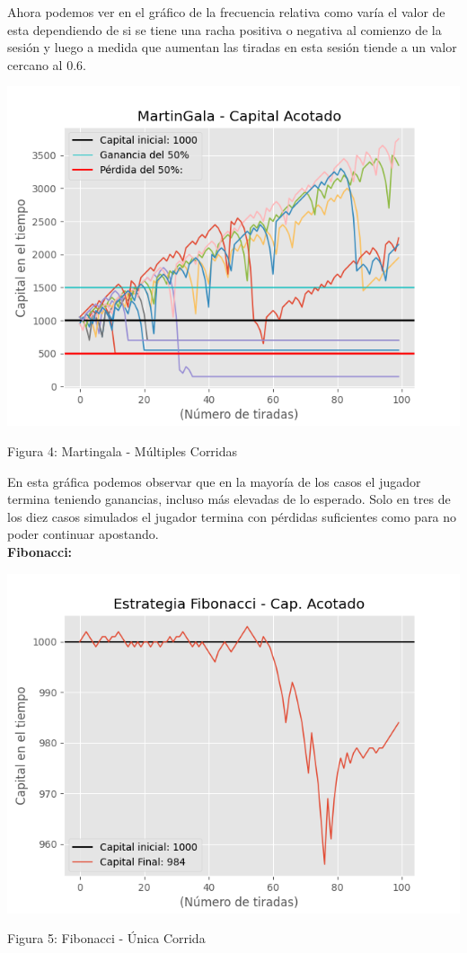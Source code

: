 \documentclass{article}
\begin{document}
Ahora podemos ver en el gráfico de la frecuencia relativa como varía el valor de esta dependiendo de si se tiene una racha positiva o negativa al comienzo de la sesión y luego a medida que aumentan las tiradas en esta sesión tiende a un valor cercano al 0.6. 


\begin{center}
    \includegraphics[width=0.7\linewidth]{MG-acotado-multiplestiradas.png}
    
    \caption{Figura 4: Martingala - Múltiples Corridas}
\end{center}

En esta gráfica podemos observar que en la mayoría de los casos el jugador termina teniendo ganancias, incluso más elevadas de lo esperado. Solo en tres de los diez casos simulados el jugador termina con pérdidas suficientes como para no poder continuar apostando.
\\

\textbf{Fibonacci:}

\begin{center}
    \includegraphics[width=0.7\linewidth]{FIB-acotado-1tirada.png}
    
    \caption{Figura 5: Fibonacci - Única Corrida}
\end{center}
\end{document}
